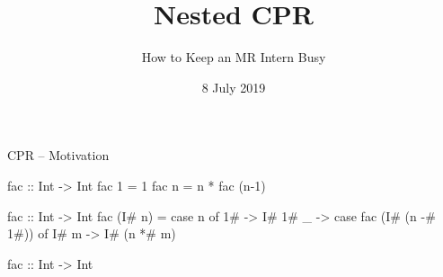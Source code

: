 \documentclass{haskellbeamer}
\title{Nested CPR}
\subtitle{How to Keep an MR Intern Busy}
\date{8 July 2019}
\begin{document}
\maketitle

\begin{frame}[fragile]{CPR -- Motivation}
  \begin{center}
    \begin{minipage}{0.7\textwidth}
      \begin{overprint}
        \begin{haskell}
          fac :: Int -> Int
          fac 1 = 1
          fac n = n * fac (n-1) 
        \end{haskell}
        \begin{haskell}
          fac :: Int -> Int
          fac (I# n) = case n of
            1# -> I# 1#
            _  -> case fac (I# (n -# 1#)) of
              I# m -> I# (n *# m)
        \end{haskell}
        \begin{haskell}
          fac :: Int -> Int
        \end{haskell}
      \end{overprint}
    \end{minipage}
  \end{center}
\end{frame}
\end{document}
